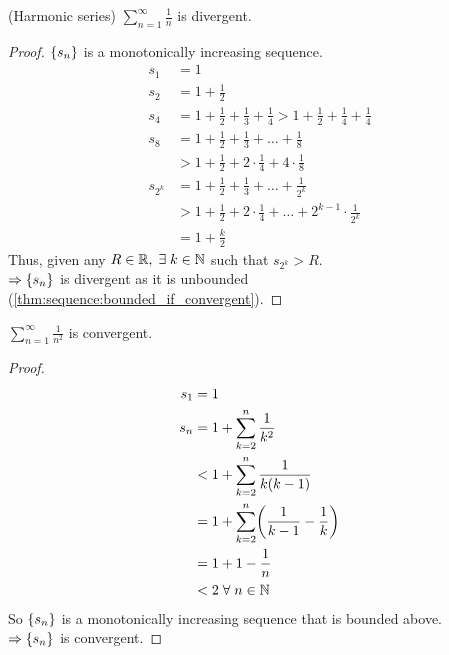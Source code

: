 \begin{examples}
    \item (Harmonic series) $\sum_{n=1}^{\infty} \frac{1}{n}$ is divergent.
    \begin{proof}
        $\set{s_{n}}$ is a monotonically increasing sequence.
        \begin{align*}
            s_{1} &= 1 \\
            s_{2} &= 1 + \frac{1}{2} \\
            s_{4} &= 1 + \frac{1}{2} + \frac{1}{3} + \frac{1}{4} > 1 + \frac{1}{2} + \frac{1}{4} + \frac{1}{4} \\
            s_{8} &= 1 + \frac{1}{2} + \frac{1}{3} + \dots + \frac{1}{8} \\
               &> 1 + \frac{1}{2} + 2 \cdot \frac{1}{4} + 4 \cdot \frac{1}{8} \\
            s_{2^{k}} &= 1 + \frac{1}{2} + \frac{1}{3} + \dots + \frac{1}{2^{k}} \\
               &> 1 + \frac{1}{2} + 2 \cdot \frac{1}{4} + \dots + 2^{k-1} \cdot \frac{1}{2^{k}} \\
               &= 1 + \frac{k}{2}
        \end{align*}
        Thus, given any $R \in \mathbb{R}, \;\exists\; k \in \mathbb{N}$ such that $s_{2^{k}} > R$. \\
        $\implies \set{s_{n}}$ is divergent as it is unbounded (\cref{thm:sequence:bounded_if_convergent}).
    \end{proof}
    \item $\sum_{n=1}^{\infty} \frac{1}{n^{2}}$ is convergent.
    \begin{proof}
        \begin{align*}
            s_{1} &= 1 \\
            s_{n} &= 1 + \sum_{k=2}^{n} \frac{1}{k^{2}} \\
            &< 1 + \sum_{k=2}^{n} \frac{1}{k(k-1)} \\
            &= 1 + \sum_{k=2}^{n} \paren{\frac{1}{k-1} - \frac{1}{k}} \\
            &= 1 + 1 - \frac{1}{n} \\
            &< 2 \;\forall\; n \in \N
        \end{align*}
        So $\set{s_{n}}$ is a monotonically increasing sequence that is bounded above. \\
        $\implies \set{s_{n}}$ is convergent.
    \end{proof}
\end{examples}

